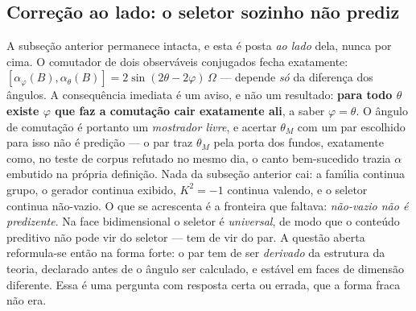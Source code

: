 \documentclass[11pt]{article}
\theoremstyle{definition}\newtheorem{deriv}{Derivação}
\begin{document}
\subsection*{Corre\c{c}\~ao ao lado: o seletor sozinho n\~ao prediz}A subse\c{c}\~ao anterior permanece intacta, e esta \'e posta \emph{ao lado} dela, nunca por cima. O comutador de dois observ\'aveis conjugados fecha exatamente: $[\alpha_\varphi(B),\alpha_\theta(B)] = 2\sin(2\theta-2\varphi)\,\Omega$ --- depende \emph{s\'o} da diferen\c{c}a dos \^angulos. A consequ\^encia imediata \'e um aviso, e n\~ao um resultado: \textbf{para todo $\theta$ existe $\varphi$ que faz a comuta\c{c}\~ao cair exatamente ali}, a saber $\varphi=\theta$. O \^angulo de comuta\c{c}\~ao \'e portanto um \emph{mostrador livre}, e acertar $\theta_M$ com um par escolhido para isso n\~ao \'e predi\c{c}\~ao --- o par traz $\theta_M$ pela porta dos fundos, exatamente como, no teste de corpus refutado no mesmo dia, o canto bem-sucedido trazia $\alpha$ embutido na pr\'opria defini\c{c}\~ao. Nada da subse\c{c}\~ao anterior cai: a fam\'\i{}lia continua grupo, o gerador continua exibido, $K^2=-1$ continua valendo, e o seletor continua n\~ao-vazio. O que se acrescenta \'e a fronteira que faltava: \emph{n\~ao-vazio n\~ao \'e predizente}. Na face bidimensional o seletor \'e \emph{universal}, de modo que o conte\'udo preditivo n\~ao pode vir do seletor --- tem de vir do par. A quest\~ao aberta reformula-se ent\~ao na forma forte: o par tem de ser \emph{derivado} da estrutura da teoria, declarado antes de o \^angulo ser calculado, e est\'avel em faces de dimens\~ao diferente. Essa \'e uma pergunta com resposta certa ou errada, que a forma fraca n\~ao era.
\end{document}
